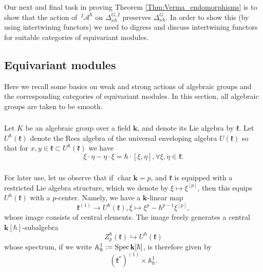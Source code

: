 \documentclass{amsart}
\theoremstyle{definition}
\newcommand{\fk}{\mathfrak{k}}
\newcommand{\sss}{\subsubsection{}}
\newcommand{\Spec}{\on{Spec}\hspace{.5mm}}
\newcommand{\on}{\mathrm}
\newcommand{\A}{\mathscr{A}}
\newcommand{\bk}{\mathbf{k}}
\numberwithin{equation}{section}
\begin{document}
Our next and final task in proving Theorem \ref{Thm:Verma_endomorphisms} is to show that the action of $\,^I\!\A^\hbar$ on $\Delta^{G,I}_{\kappa\hbar}$ preserves $\Delta^G_{\kappa\hbar}$. In order to show this (by using intertwining functors) we need to digress and discuss intertwining functors for suitable categories of equivariant modules. 

\subsection{Equivariant modules}
Here we recall some basics on weak and strong actions of algebraic groups and the corresponding categories of equivariant modules. In this section, all algebraic groups are taken to be smooth.

\sss  Let $K$ be an algebraic group over a field $\bk$, and denote its Lie algebra by $\fk$.
Let $U^{\hbar}(\fk)$ denote the Rees algebra of the universal enveloping algebra $U(\fk)$
so that for $x,y\in \fk\subset U^\hbar(\fk)$ we have
$$\xi \cdot \eta - \eta \cdot \xi = \hbar \cdot [\xi,\eta], \forall \xi,\eta \in \fk.$$

\sss For later use, let us observe that if $\operatorname{char}\bk=p$, and $\fk$ is equipped with a restricted Lie algebra structure, which we denote by $\xi \mapsto \xi^{[p]}$, then this equips $U^\hbar(\fk)$ with a $p$-center. Namely, we have a  $\bk$-linear map  
$$\fk^{(1)} \rightarrow U^\hbar(\fk),  \xi \mapsto \xi^p - \hbar^{p-1} \xi^{[p]},$$
whose image consists of central elements. The image freely generates a central  $\bk[\hbar]$-subalgebra $$Z_p^\hbar(\fk) \hookrightarrow U^\hbar(\fk)$$
whose spectrum, if we write $\mathbb{A}^1_\hbar := \Spec \bk[\hbar]$, is therefore given by $$(\fk^*)^{(1)} \times \mathbb{A}^1_\hbar.$$
\end{document}
